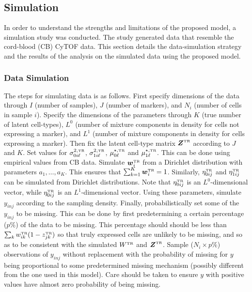 \documentclass[12pt,]{article}
\newcommand{\true}{{\mbox{\tiny TR}}}
\newcommand{\bZ}{\mbox{\boldmath $Z$}}
\newcommand{\bw}{\mbox{\boldmath $w$}}
\begin{document}
\subsection{Simulation} %
In order to understand the strengths and limitations of the proposed model, a
simulation study was conducted. The study generated data that resemble the
cord-blood (CB) CyTOF data. This section details the data-simulation strategy
and the results of the analysis on the simulated data using the proposed model.

\subsubsection{Data Simulation}
The steps for simulating data is as follows.
First specify dimensions of the data through $I$ (number of samples), $J$
(number of markers), and $N_i$ (number of cells in sample $i$). Specify the
dimensions of the parameters through $K$ (true number of latent cell-types),
$L^0$ (number of mixture components in density for cells not expressing a
marker), and $L^1$ (number of mixture components in density for cells
expressing a marker). Then fix the latent cell-type matrix $\bZ^\true$
according to $J$ and $K$. Set values for $\sigma^{2, \true}_{0i\ell}$,
$\sigma^{2,\true}_{1i\ell}$, $\mu^{\star, \true}_{0\ell}$ and $\mu^{\star,
\true}_{1\ell}$.  This can be done using empirical values from CB data.
Simulate $\bw^\true_i$ from a Dirichlet distribution with parameters $a_1,
\ldots, a_K$. This ensures that $\sum_{k=1}^K \bw^\true_i = 1$.
Similarly, $\eta^\true_{0ij}$ and $\eta^\true_{1ij}$ can be simulated
from Dirichlet distributions. Note that $\eta^\true_{0ij}$ is an
$L^0$-dimensional vector, while $\eta^\true_{0ij}$ is an $L^1$-dimensional
vector. Using these parameters, simulate $y_{inj}$ according to the sampling
density. Finally, probabilistically set some of the $y_{inj}$ to be missing.
This can be done by first predetermining a certain percentage ($p\%$) of the
data to be missing. This percentage should should be less than $\sum_k
w^\true_{ik}(1-z^\true_{jk})$ so that truly expressed cells are unlikely to be
missing, and so as to be consistent with the simulated $W^\true$ and
$\bZ^\true$. Sample ($N_i\times p\%$) observations of $y_{inj}$ without
replacement with the probability of missing for $y$ being proportional to some
predetermined missing mechanism (possibly different from the one used in this
model). Care should be taken to ensure $y$ with positive values have almost
zero probability of being missing.
\end{document}
